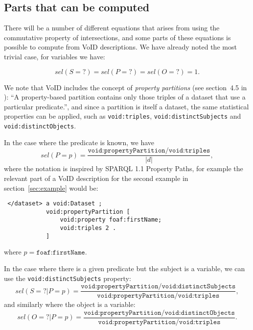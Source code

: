 \documentclass[12pt, draft]{article}
\newcommand{\rdfterm}[1]{\texttt{#1}}
\newcommand{\sel}[1]{\ensuremath{sel\left(#1\right)}}
\begin{document}
\subsection{Parts that can be computed}

There will be a number of different equations that arises from using
the commutative property of intersections, and some parts of these
equations is possible to compute from VoID descriptions. We have
already noted the most trivial case, for variables we have:

\begin{equation}\label{eq:selvar}
\sel{S = ?} = \sel{P = ?} = \sel{O = ?} = 1 .
\end{equation}

We note that VoID includes the concept of \emph{property partitions}
(see section~4.5 in \cite{voidnote}): ``A property-based partition
contains only those triples of a dataset that use a particular
predicate.'', and since a partition is itself a dataset, the same
statistical properties can be applied, such as \rdfterm{void:triples},
\rdfterm{void:distinctSubjects} and \rdfterm{void:distinctObjects}.

In the case where the predicate is known, we have
\begin{equation}\label{eq:selPp}
 \sel{P = p} =
   \frac{\rdfterm{void:propertyPartition/void:triples}}{|d|} ,
\end{equation}
where the notation is inspired by SPARQL 1.1 Property Paths, for
example the relevant part of a VoID description for the second example
in section~\ref{sec:example} would be:
\begin{verbatim}
 </dataset> a void:Dataset ;
            void:propertyPartition [
                void:property foaf:firstName;
                void:triples 2 .
            ]
\end{verbatim}
where $p = \rdfterm{foaf:firstName}$.


In the case where there is a given predicate but the subject is a
variable, we can use the \rdfterm{void:distinctSubjects} property:
\begin{equation}\label{eq:selSvPp}
 \sel{S = ? | P = p} =
   \frac{\rdfterm{void:propertyPartition/void:distinctSubjects}}{\rdfterm{void:propertyPartition/void:triples}} ,
\end{equation}
and similarly where the object is a variable:
\begin{equation}\label{eq:selOvPp}
 \sel{O = ? | P = p} =
   \frac{\rdfterm{void:propertyPartition/void:distinctObjects}}{\rdfterm{void:propertyPartition/void:triples}} .
\end{equation}
\end{document}
